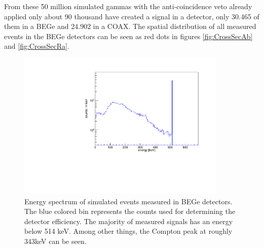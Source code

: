 \documentclass[encoding=utf8,british]{tumphthesis}
\begin{document}
From these 50 million simulated gammas with the anti-coincidence veto already applied only about 90 thousand have created a signal in a detector, only 30.465 of them in a BEGe and 24.902 in a COAX.
The spatial distribution of all measured events in the BEGe detectors can be seen as red dots in figures \ref{fig:CrossSecAb} and \ref{fig:CrossSecRa}.

\begin{figure}[t!]
	\centering
	\ifmakefigures%
	\includegraphics[width=100mm]{./Bilder/MC-514-Phasenraum.pdf}
	\fi%
	\caption{
    Energy spectrum of simulated events measured in BEGe detectors.
	The blue colored bin represents the counts used for determining the detector efficiency.
	The majority of measured signals has an energy below 514 keV.
	Among other things, the Compton peak at roughly 343keV can be seen.  
	}
	\label{fig:PhasenraumMC514}
\end{figure}
\end{document}
